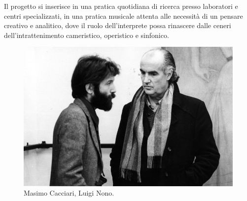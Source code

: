 \documentclass{gs-adonis}
\begin{document}
Il progetto si inserisce in una pratica quotidiana di ricerca presso laboratori
e centri specializzati, in una pratica musicale attenta alle necessità di un
pensare creativo e analitico, dove il ruolo dell'interprete possa rinascere
dalle ceneri dell'intrattenimento cameristico, operistico e sinfonico.

\begin{figure}[t]
  \centering
  \includegraphics[width=\linewidth]{images/luigi-nono-massimo-cacciari.jpg}
  \captionsetup{width=.81\linewidth}
  \caption{Masimo Cacciari, Luigi Nono.}
  \label{cacciari}
\end{figure}


%
\end{document}

